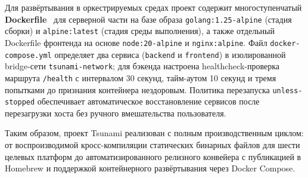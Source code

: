 Для развёртывания в оркестрируемых средах проект содержит многоступенчатый \textbf{Dockerfile}~\cite{docker} для серверной части на базе образа \texttt{golang:1.25-alpine} (стадия сборки) и \texttt{alpine:latest} (стадия среды выполнения), а также отдельный Dockerfile фронтенда на основе \texttt{node:20-alpine} и \texttt{nginx:alpine}.
Файл \texttt{docker-compose.yml} определяет два сервиса (\texttt{backend} и \texttt{frontend}) в изолированной bridge-сети \texttt{tsunami-network}; для бэкенда настроена healthcheck-проверка маршрута \texttt{/health} с интервалом 30 секунд, тайм-аутом 10 секунд и тремя попытками до признания контейнера нездоровым.
Политика перезапуска \texttt{unless-stopped} обеспечивает автоматическое восстановление сервисов после перезагрузки хоста без ручного вмешательства пользователя.

Таким образом, проект Tsunami реализован с полным производственным циклом: от воспроизводимой кросс-компиляции статических бинарных файлов для шести целевых платформ до автоматизированного релизного конвейера с публикацией в Homebrew и поддержкой контейнерного развёртывания через Docker Compose.

